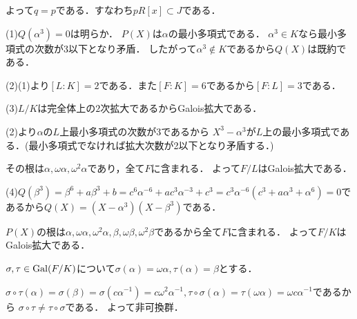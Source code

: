 \documentclass[
		book,
		head_space=20mm,
		foot_space=20mm,
		gutter=10mm,
		line_length=190mm
]{jlreq}
\begin{document}
よって$q=p$である．すなわち$pR[x]\subset J$である．

(1)$Q(\alpha^3)=0$は明らか．
$P(X)$は$\alpha$の最小多項式である．
$\alpha^3\in K$なら最小多項式の次数が$3$以下となり矛盾．
したがって$\alpha^3\notin K$であるから$Q(X)$は既約である．


(2)(1)より$[L:K]=2$である．また$[F:K]=6$であるから$[F:L]=3$である．

(3)$L/K$は完全体上の$2$次拡大であるからGalois拡大である．

(2)より$\alpha$の$L$上最小多項式の次数が$3$であるから
$X^3-\alpha^3$が$L$上の最小多項式である．(最小多項式でなければ拡大次数が2以下となり矛盾する．)

その根は$\alpha,\omega\alpha,\omega^2\alpha$であり，全て$F$に含まれる．
よって$F/L$はGalois拡大である．

(4)$Q(\beta^3)=\beta^6+a\beta^3+b=c^6 \alpha^{-6}+ac^3\alpha^{-3}+c^3=c^3\alpha^{-6}(c^3+a\alpha^3+\alpha^6)=0$であるから$Q(X)=(X-\alpha^3)(X-\beta^3)$である．

$P(X)$の根は$\alpha,\omega\alpha,\omega^2\alpha,\beta,\omega\beta,\omega^2\beta$であるから全て$F$に含まれる．
よって$F/K$はGalois拡大である．

$\sigma,\tau\in \mathop{\mathrm{Gal}}(F/K)$について$\sigma(\alpha)=\omega \alpha,\tau(\alpha)=\beta$とする．

$\sigma\circ\tau(\alpha)=\sigma(\beta)=\sigma(c\alpha^{-1})=c \omega^2\alpha^{-1},\tau\circ\sigma(\alpha)=\tau(\omega \alpha)=\omega c \alpha^{-1}$であるから
$\sigma\circ\tau\neq \tau\circ\sigma$である．
よって非可換群．
\end{document}

